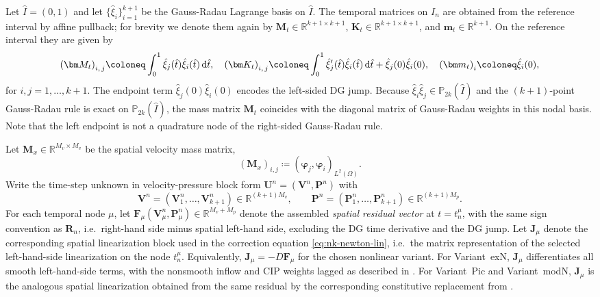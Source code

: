 \documentclass[DIV=16]{scrartcl}
\newcommand{\In}{I_n}
\newcommand{\drv}{\mkern3mu\mathrm{d}}
\begin{document}
Let $\hat I=(0,1)$ and let $\{\hat\xi_i\}_{i=1}^{k+1}$ be the Gauss-Radau
Lagrange basis on $\hat I$.
The temporal matrices on $\In$ are obtained from the reference interval by
affine pullback; for brevity we denote them again by
$\bm M_t\in\mathbb R^{k+1\times k+1}$,
$\bm K_t\in\mathbb R^{k+1\times k+1}$, and
$\bm m_t\in\mathbb R^{k+1}$.
On the reference interval they are given by
\begin{equation*}
  {(\bm M_t)}_{i,\,j} \coloneq
  \int_0^1 \hat\xi_j(\hat t)\hat\xi_i(\hat t)\drv\hat t,\quad
  {(\bm K_t)}_{i,\,j} \coloneq
  \int_0^1 \hat\xi_j'(\hat t)\hat\xi_i(\hat t)\drv\hat t
  + \hat\xi_j(0)\hat\xi_i(0),\quad
  {(\bm m_t)}_{i} \coloneq  \hat\xi_i(0),
\end{equation*}
for $i,j=1,\dots,k+1$.
The endpoint term $\hat\xi_j(0)\hat\xi_i(0)$ encodes the left-sided DG jump.
Because $\hat\xi_i\hat\xi_j\in \mathbb P_{2k}(\hat I)$ and the $(k{+}1)$-point
Gauss-Radau rule is exact on $\mathbb P_{2k}(\hat I)$, the mass matrix
$\bm M_t$ coincides with the diagonal matrix of Gauss-Radau weights in this
nodal basis. Note that the left endpoint is not a quadrature node of the
right-sided Gauss-Radau rule.

Let $\bm M_x\in\mathbb R^{M_v\times M_v}$ be the spatial velocity mass matrix,
\[
  (\bm M_x)_{i,j} \coloneq  (\boldsymbol\varphi_j,\boldsymbol\varphi_i)_{L^2(\Omega)}.
\]
Write the time-step unknown in velocity-pressure block form
$\bm U^n=(\bm V^n,\bm P^n)$ with
\[
  \bm V^n=(\bm V_1^n,\ldots,\bm V_{k+1}^n)\in\mathbb R^{(k+1)M_v},\qquad
  \bm P^n=(\bm P_1^n,\ldots,\bm P_{k+1}^n)\in\mathbb R^{(k+1)M_p}.
\]
For each temporal node $\mu$, let
$\bm F_\mu(\bm V_\mu^n,\bm P_\mu^n)\in\mathbb R^{M_v+M_p}$ denote the assembled
\emph{spatial residual vector} at $t=t_n^\mu$, with the same sign convention as
$\bm R_n$, i.e.\ right-hand side minus spatial left-hand side, excluding the DG
time derivative and the DG jump.
Let $\bm J_\mu$ denote the corresponding spatial linearization block used in the
correction equation \eqref{eq:nk-newton-lin}, i.e.\ the matrix representation of
the selected left-hand-side linearization on the node $t_n^\mu$.
Equivalently, $\bm J_\mu=-D\bm F_\mu$ for the chosen nonlinear variant.
For Variant~exN, $\bm J_\mu$ differentiates all smooth left-hand-side terms,
with the nonsmooth inflow and CIP weights lagged as described in
. For Variant~Pic and Variant~modN, $\bm J_\mu$ is the
analogous spatial linearization obtained from the same residual by the
corresponding constitutive replacement from .
\end{document}
